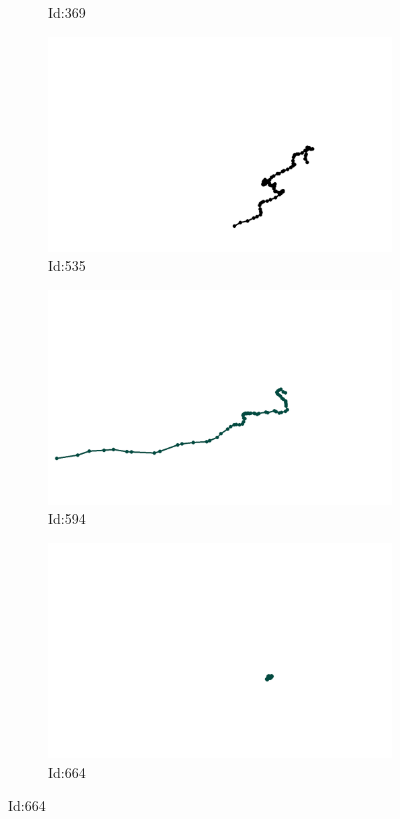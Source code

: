 \documentclass[12pt,twoside]{report}
\begin{document}
\begin{figure}
\begin{subfigure}[b]{0.20\textwidth}
\caption{Id:369}
\end{subfigure}
\begin{subfigure}[b]{0.20\textwidth}
\centering
\includegraphics[width=\textwidth]{../../trajectories/535.png}
\caption{Id:535}
\end{subfigure}
\begin{subfigure}[b]{0.20\textwidth}
\centering
\includegraphics[width=\textwidth]{../../trajectories/594.png}
\caption{Id:594}
\end{subfigure}
\begin{subfigure}[b]{0.20\textwidth}
\centering
\includegraphics[width=\textwidth]{../../trajectories/664.png}
\caption{Id:664}
\end{subfigure}
\end{figure}
\end{document}
